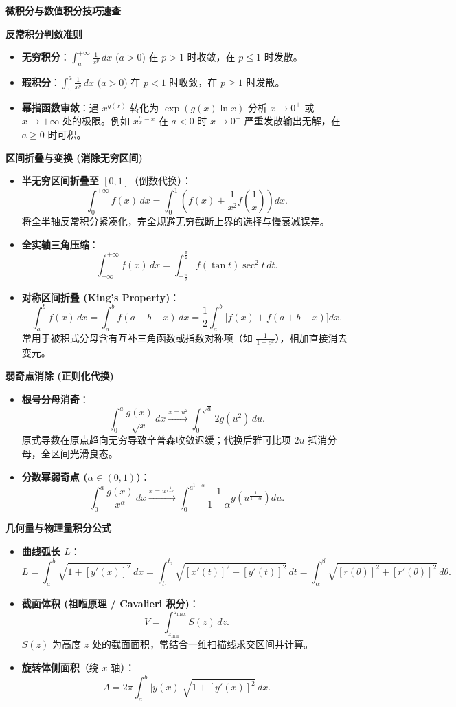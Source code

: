 \textbf{微积分与数值积分技巧速查}

\textbf{反常积分判敛准则}
\begin{itemize}
    \item \textbf{无穷积分}：$\int_a^{+\infty} \frac{1}{x^p} \, dx$ ($a > 0$) 在 $p > 1$ 时收敛，在 $p \le 1$ 时发散。
    \item \textbf{瑕积分}：$\int_0^a \frac{1}{x^p} \, dx$ ($a > 0$) 在 $p < 1$ 时收敛，在 $p \ge 1$ 时发散。
    \item \textbf{幂指函数审敛}：遇 $x^{g(x)}$ 转化为 $\exp(g(x) \ln x)$ 分析 $x \to 0^+$ 或 $x \to +\infty$ 处的极限。例如 $x^{\frac{a}{x}-x}$ 在 $a < 0$ 时 $x \to 0^+$ 严重发散输出无解，在 $a \ge 0$ 时可积。
\end{itemize}

\textbf{区间折叠与变换 (消除无穷区间)}
\begin{itemize}
    \item \textbf{半无穷区间折叠至 $[0, 1]$}（倒数代换）：
    \[
    \int_0^{+\infty} f(x) \, dx = \int_0^1 \left( f(x) + \frac{1}{x^2} f\!\left(\frac{1}{x}\right) \right) dx.
    \]
    将全半轴反常积分紧凑化，完全规避无穷截断上界的选择与慢衰减误差。
    \item \textbf{全实轴三角压缩}：
    \[
    \int_{-\infty}^{+\infty} f(x) \, dx = \int_{-\frac{\pi}{2}}^{\frac{\pi}{2}} f(\tan t) \sec^2 t \, dt.
    \]
    \item \textbf{对称区间折叠 (King's Property)}：
    \[
    \int_a^b f(x) \, dx = \int_a^b f(a+b-x) \, dx = \frac{1}{2} \int_a^b \bigl[f(x) + f(a+b-x)\bigr] dx.
    \]
    常用于被积式分母含有互补三角函数或指数对称项（如 $\frac{1}{1 + e^x}$），相加直接消去变元。
\end{itemize}

\textbf{弱奇点消除 (正则化代换)}
\begin{itemize}
    \item \textbf{根号分母消奇}：
    \[
    \int_0^a \frac{g(x)}{\sqrt{x}} \, dx \xrightarrow{x = u^2} \int_0^{\sqrt{a}} 2 g(u^2) \, du.
    \]
    原式导数在原点趋向无穷导致辛普森收敛迟缓；代换后雅可比项 $2u$ 抵消分母，全区间光滑良态。
    \item \textbf{分数幂弱奇点 ($\alpha \in (0, 1)$)}：
    \[
    \int_0^a \frac{g(x)}{x^\alpha} \, dx \xrightarrow{x = u^{\frac{1}{1-\alpha}}} \int_0^{a^{1-\alpha}} \frac{1}{1-\alpha} g\!\left(u^{\frac{1}{1-\alpha}}\right) du.
    \]
\end{itemize}

\textbf{几何量与物理量积分公式}
\begin{itemize}
    \item \textbf{曲线弧长 $L$}：
    \[
    L = \int_a^b \sqrt{1 + [y'(x)]^2} \, dx = \int_{t_1}^{t_2} \sqrt{[x'(t)]^2 + [y'(t)]^2} \, dt = \int_\alpha^\beta \sqrt{[r(\theta)]^2 + [r'(\theta)]^2} \, d\theta.
    \]
    \item \textbf{截面体积 (祖暅原理 / Cavalieri 积分)}：
    \[
    V = \int_{z_{\min}}^{z_{\max}} S(z) \, dz.
    \]
    $S(z)$ 为高度 $z$ 处的截面面积，常结合一维扫描线求交区间并计算。
    \item \textbf{旋转体侧面积}（绕 $x$ 轴）：
    \[
    A = 2\pi \int_a^b |y(x)| \sqrt{1 + [y'(x)]^2} \, dx.
    \]
\end{itemize}

